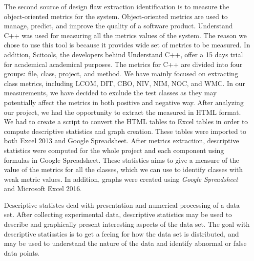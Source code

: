 The second source of design flaw extraction identification is to measure the object-oriented metrics for the system. Object-oriented metrics are used to manage, predict, and improve the quality of a software product\cite{rodriguez2001overview}. Understand C++ was used for measuring all the metrics values of the system. The reason we chose to use this tool is because it provides wide set of metrics to be measured. In addition, Scitools, the developers behind Understand C++, offer a 15 days trial for academical academical purposes. The metrics for C++ are divided into four groups: file, class, project, and method. We have mainly focused on extracting class metrics, including LCOM, DIT, CBO, NIV, NIM, NOC, and WMC. In our measurements, we have decided to exclude the test classes as they may potentially affect the metrics in both positive and negative way. After analyzing our project, we had the opportunity to extract the measured in HTML format. We had to create a script to convert the HTML tables to Excel tables in order to compute descriptive statistics and graph creation. These tables were imported to both Excel 2013 and Google Spreadsheet. After metrics extraction, descriptive statistics were computed for the whole project and each component using formulas in Google Spreadsheet. These statistics aims to give a measure of the value of the metrics for all the classes, which we can use to identify classes with weak metric values. In addition, graphs were created using \textit{Google Spreadsheet} and Microsoft Excel 2016. 

Descriptive statistcs deal with presentation and numerical processing of a data set\cite{Wohlin:2000:ESE:330775}. After collecting experimental data, descriptive statistics may be used to describe and graphically present interesting aspects of the data set. The goal with descriptive statisstics is to get a feeing for how the data set is distributed, and may be used to understand the nature of the data and identify abnormal or false data points. 

